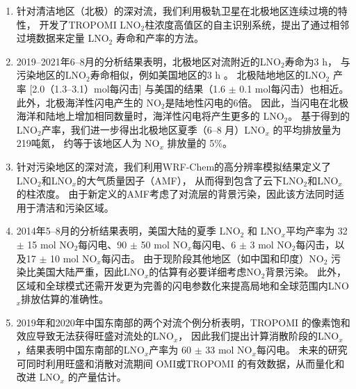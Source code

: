 \begin{enumerate}[label=（\arabic*）, labelindent=\parindent, leftmargin=0pt, widest=0, itemindent=*, topsep=0pt, partopsep=0pt, parsep=0pt]

\item 针对清洁地区（北极）的深对流，我们利用极轨卫星在北极地区连续过境的特性，
开发了TROPOMI LNO$_2$柱浓度高值区的自主识别系统，提出了通过相邻过境数据来定量 LNO$_2$ 寿命和产率的方法。

\item 2019--2021年6--8月的分析结果表明，北极地区对流附近的LNO$_2$寿命为3 h，
与污染地区的LNO$_2$寿命相似，例如美国地区的3 h \citep{Nault.2017}。
北极陆地地区的LNO$_2$ 产率 [2.0（1.3--3.1）mol每闪击] 与美国的结果（1.6 $\pm$ 0.1 mol每闪击）也相近\citep{Lapierre.2020}。
此外，北极海洋性闪电产生的 NO$_2$是陆地性闪电的6倍。
因此，当闪电在北极海洋和陆地上增加相同数量时，海洋性闪电将产生更多的 LNO$_2$。
基于得到的LNO$_2$产率，我们进一步得出北极地区夏季（6--8 月）LNO$_x$ 的平均排放量为219吨氮，
约等于该地区人为 NO$_x$ 排放量的 5\%。

\item 针对污染地区的深对流，我们利用WRF-Chem的高分辨率模拟结果定义了LNO$_2$和LNO$_x$的大气质量因子（AMF），
从而得到包含了云下LNO$_2$和LNO$_x$的柱浓度。
由于新定义的AMF考虑了对流层的背景污染，因此该方法同时适用于清洁和污染区域。

\item 2014年5--8月的分析结果表明，美国大陆的夏季 LNO$_2$ 和 LNO$_x$平均产率为
32 $\pm$ 15 mol NO$_2$每闪电、90 $\pm$ 50 mol NO$_x$每闪电、6 $\pm$ 3 mol NO$_2$每闪击，以及17 $\pm$ 10 mol NO$_x$每闪击。
由于现阶段其他地区（如中国和印度）NO$_2$ 污染比美国大陆严重，因此LNO$_x$的估算有必要详细考虑NO$_2$背景污染。
此外，区域和全球模式还需开发更为完善的闪电参数化来提高局地和全球范围内LNO$_x$排放估算的准确性。

\item 2019年和2020年中国东南部的两个对流个例分析表明，TROPOMI 的像素饱和效应导致无法获得旺盛对流处的LNO$_x$，
因此我们提出计算消散阶段的LNO$_x$，结果表明中国东南部的LNO$_x$产率为 60 $\pm$ 33 mol NO$_x$每闪电。
未来的研究可同时利用旺盛和消散对流期间 OMI或TROPOMI 的有效数据，从而量化和改进 LNO$_x$ 的产量估计。

\end{enumerate}

